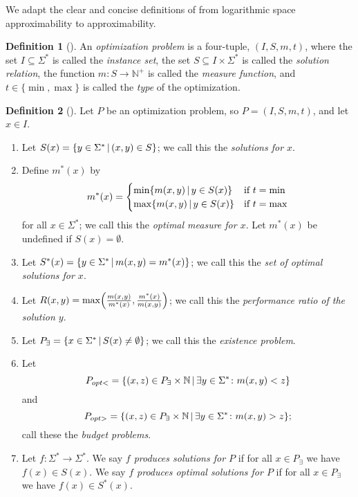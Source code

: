\documentclass[]{article}
\theoremstyle{plain}
\theoremstyle{definition}
\newtheorem{definition}{Definition}
\newcommand{\lb}{\left\{}
\newcommand{\rb}{\right\}}
\newcommand{\st}{\,\middle|\,}
\let\originalleft\left
\let\originalright\right
\renewcommand{\left}{\mathopen{}\mathclose\bgroup\originalleft}
\renewcommand{\right}{\aftergroup\egroup\originalright}
\begin{document}
We adapt the clear and concise definitions of \cite{tantau07} from logarithmic space approximability to \NC{} approximability.

\begin{definition}[\cite{acgkmp99}]
  An \emph{optimization problem} is a four-tuple, $(I, S, m, t)$, where the set $I \subseteq \Sigma^*$ is called the \emph{instance set}, the set $S \subseteq I \times \Sigma^*$ is called the \emph{solution relation}, the function $m \colon S \to \mathbb{N}^+$ is called the \emph{measure function}, and $t \in \{\min, \max\}$ is called the \emph{type} of the optimization.
\end{definition}

\begin{definition}[\cite{tantau07}]
  Let $P$ be an optimization problem, so $P = (I, S, m, t)$, and let $x\in I$.
  \begin{enumerate}
  \item Let $S(x)=\lb y\in\Sigma^* \st (x, y)\in S \rb$; we call this the \emph{solutions for $x$}.
  \item Define $m^*(x)$ by
    \begin{displaymath}
      m^*(x) =
      \begin{cases}
        \min \lb m(x, y) \st y\in S(x) \rb & \text{if } t = \min \\
        \max \lb m(x, y) \st y\in S(x) \rb & \text{if } t = \max
      \end{cases}
    \end{displaymath}
    for all $x\in \Sigma^*$; we call this the \emph{optimal measure for $x$}.
    Let $m^*(x)$ be undefined if $S(x)=\emptyset$.
  \item Let $S^*(x)=\lb y\in\Sigma^* \st m(x, y) = m^*(x) \rb$; we call this the \emph{set of optimal solutions for $x$}.
  \item Let $R(x, y)=\max\left( \frac{m(x, y)}{m^*(x)}, \frac{m^*(x)}{m(x, y)} \right)$; we call this the \emph{performance ratio of the solution $y$}.
  \item Let $P_\exists = \lb x\in \Sigma^* \st S(x) \neq \emptyset \rb$; we call this the \emph{existence problem}.
  \item Let
    \begin{displaymath}
      P_{opt<}=\lb (x, z) \in P_\exists\times\mathbb{N} \st \exists y\in\Sigma^*\colon m(x, y) < z \rb
    \end{displaymath}
    and
    \begin{displaymath}
      P_{opt>}=\lb (x, z) \in P_\exists\times\mathbb{N} \st \exists y\in\Sigma^*\colon m(x, y) > z \rb;
    \end{displaymath}
    call these the \emph{budget problems}.
  \item Let $f\colon \Sigma^*\to\Sigma^*$.
    We say \emph{$f$ produces solutions for $P$} if for all $x\in P_\exists$ we have $f(x)\in S(x)$.
    We say \emph{$f$ produces optimal solutions for $P$} if for all $x\in P_\exists$ we have $f(x)\in S^*(x)$.
  \end{enumerate}
\end{definition}
\end{document}

